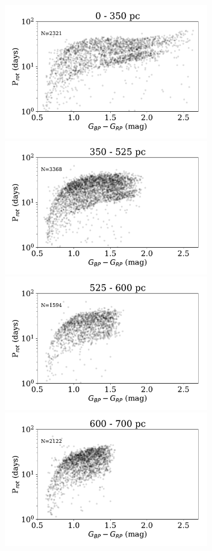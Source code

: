 \documentclass[preprint2]{aastex62}
\begin{document}
\begin{figure}[]
\centering
\includegraphics[width=3.5in]{fig2a}
\includegraphics[width=3.5in]{fig2b}
\includegraphics[width=3.5in]{fig2c}
\includegraphics[width=3.5in]{fig2d}

\end{figure}
\end{document}
